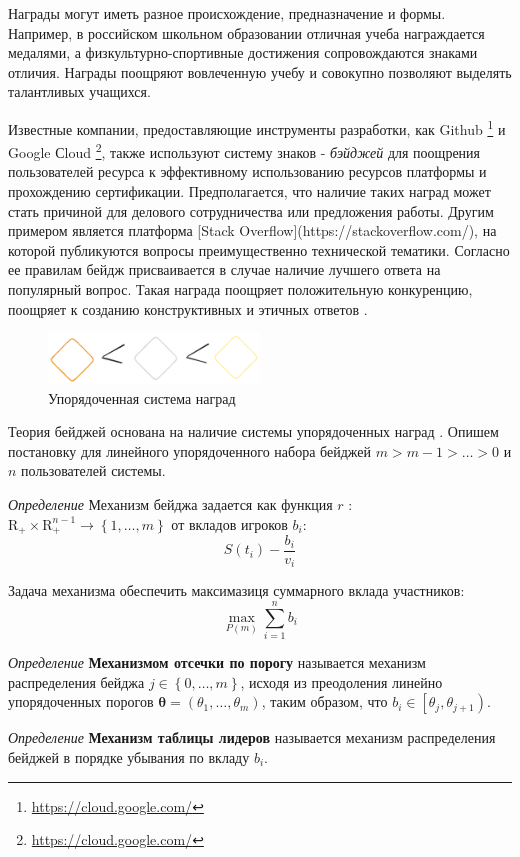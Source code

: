 Награды могут иметь разное происхождение, предназначение и формы. 
Например, в российском школьном образовании отличная учеба награждается медалями, а физкультурно-спортивные достижения сопровождаются знаками отличия.
Награды поощряют вовлеченную учебу и совокупно позволяют выделять талантливых учащихся. 

Известные компании, предоставляющие инструменты разработки, как Github \footnote{\url{https://cloud.google.com/}}
и Google Сloud \footnote{\url{https://cloud.google.com/}}, также используют систему знаков - \textit{бэйджей} 
для поощрения пользователей ресурса к эффективному использованию ресурсов платформы и прохождению сертификации. 
Предполагается, что наличие таких наград может стать причиной для делового сотрудничества или предложения работы. Другим примером является платформа [Stack Overflow](https://stackoverflow.com/),
на которой публикуются вопросы преимущественно технической тематики.
Согласно ее правилам бейдж присваивается в случае наличие лучшего ответа на популярный вопрос.
Такая награда поощряет положительную конкуренцию, поощряет к созданию конструктивных и этичных ответов \cite{yanovsky2021one}.
\begin{figure}[h]
    \centering
    \includegraphics[width=0.5\textwidth]{assets/pedagogic/social/badge.excalidraw.png}
    \caption{Упорядоченная система наград}
    \label{badge}
\end{figure}


Теория бейджей основана на наличие системы упорядоченных наград \cite{Easley2013}. Опишем постановку для линейного
упорядоченного набора бейджей $m > m-1 > \dots > 0$ и $n$  пользователей системы.

\textit{Определение} Механизм бейджа задается как функция $r$ : $\mathrm{R}_{+} \times \mathrm{R}_{+}^{n-1} \rightarrow \left\{1, \dots,m \right\}$ 
от вкладов игроков $b_i$:
\begin{equation}
    S(t_i) - \frac{b_i}{v_i}
\end{equation}

Задача механизма обеспечить максимазиця суммарного вклада участников:
\begin{equation}
    \max_{P(m)} \sum_{i=1}^n b_i
\end{equation}

\textit{Определение} \textbf{Механизмом отсечки по порогу} называется механизм распределения бейджа $j \in \left\{0,\dots,m\right\}$, исходя
из преодоления линейно упорядоченных порогов $\mathbf{\theta} =(\theta_1,\dots,\theta_m)$, таким образом, что $b_i \in \left[\theta_j,\theta_{j+1}\right)$.

\textit{Определение} \textbf{Механизм таблицы лидеров} называется механизм распределения бейджей в порядке убывания по вкладу $b_i$.






